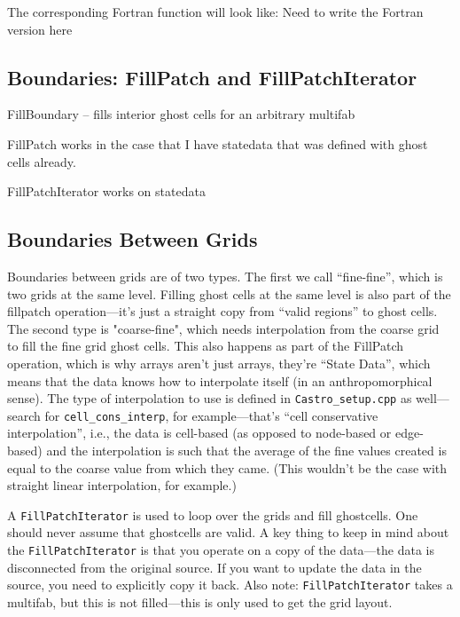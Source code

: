 The corresponding Fortran function will look like:
{\color{red} Need to write the Fortran version here}



\subsection{Boundaries: FillPatch and FillPatchIterator}

FillBoundary -- fills interior ghost cells for an arbitrary multifab

FillPatch works in the case that I have statedata that was defined
with ghost cells already.

FillPatchIterator works on statedata 


\subsection{Boundaries Between Grids}
Boundaries between grids are of two types. The first we call
``fine-fine'', which is two grids at the same level.  Filling ghost
cells at the same level is also part of the fillpatch operation---it's
just a straight copy from ``valid regions'' to ghost cells. The second
type is "coarse-fine", which needs interpolation from the coarse grid
to fill the fine grid ghost cells.  This also happens as part of the
FillPatch operation, which is why arrays aren't just arrays, they're
``State Data'', which means that the data knows how to interpolate
itself (in an anthropomorphical sense).  The type of interpolation to
use is defined in {\tt Castro\_setup.cpp} as well---search for
{\tt cell\_cons\_interp}, for example---that's ``cell conservative
interpolation'', i.e., the data is cell-based (as opposed to node-based
or edge-based) and the interpolation is such that the average of the
fine values created is equal to the coarse value from which they came.
(This wouldn't be the case with straight linear interpolation, for
example.)

A {\tt FillPatchIterator} is used to loop over the grids and fill
ghostcells.  One should never assume that ghostcells are valid.  A key
thing to keep in mind about the {\tt FillPatchIterator} is that you
operate on a copy of the data---the data is disconnected from the
original source.  If you want to update the data in the source,
you need to explicitly copy it back.  Also note: {\tt FillPatchIterator}
takes a multifab, but this is not filled---this is only used to
get the grid layout.  

